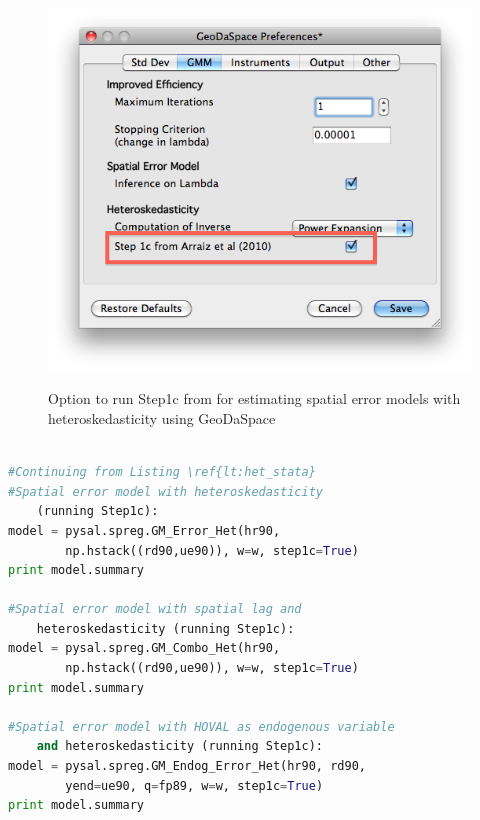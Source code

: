 \documentclass{article}
\begin{document}
\begin{figure}[htb]
\caption{Option to run Step1c from \citet{Arraiz10} for estimating spatial error models with heteroskedasticity using GeoDaSpace}
\label{f:GS_pref_step1c}
\begin{center}
\includegraphics[width=0.7\linewidth]{GS_pref_step1c.png}\\
\end{center}
\end{figure}

\begin{code}
\begin{lstlisting}[label=lt:het_endog_stata,caption=Using PySAL to match the results of spatial error models with heteroskedasticity and endogenous variables or spatial lag from Stata,language=Python]

#Continuing from Listing \ref{lt:het_stata}
#Spatial error model with heteroskedasticity
    (running Step1c):
model = pysal.spreg.GM_Error_Het(hr90,
        np.hstack((rd90,ue90)), w=w, step1c=True)
print model.summary

#Spatial error model with spatial lag and
    heteroskedasticity (running Step1c):
model = pysal.spreg.GM_Combo_Het(hr90,
        np.hstack((rd90,ue90)), w=w, step1c=True)
print model.summary

#Spatial error model with HOVAL as endogenous variable
    and heteroskedasticity (running Step1c):
model = pysal.spreg.GM_Endog_Error_Het(hr90, rd90,
        yend=ue90, q=fp89, w=w, step1c=True)
print model.summary

\end{lstlisting}
\end{code}


\newpage


\end{document}
